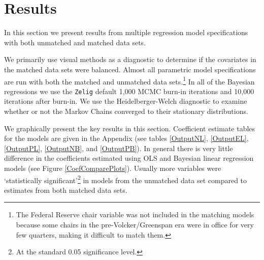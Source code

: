 \documentclass[a4paper]{article}\usepackage{graphicx, color}
\begin{document}
\section{Results}

In this section we present results from multiple regression model specifications with both unmatched and matched data sets. 

We primarily use visual methods as a diagnostic to determine if the covariates in the matched data sets were balanced.  Almost all parametric model specifications are run with both the matched and unmatched data sets.\footnote{The Federal Reserve chair variable was not included in the matching models because some chairs in the pre-Volcker/Greenspan era were in office for very few quarters, making it difficult to match them.} In all of the Bayesian regressions we use the {\tt{Zelig}} default 1,000 MCMC burn-in iterations and 10,000 iterations after burn-in. We use the Heidelberger-Welch diagnostic to examine whether or not the Markov Chains converged to their stationary distributions.

We graphically present the key results in this section. Coefficient estimate tables for the models are given in the Appendix (see tables \ref{OutputNL}, \ref{OutputEL}, \ref{OutputPL}, \ref{OutputNB}, and \ref{OutputPB}). In general there is very little difference in the coefficients estimated using OLS and Bayesian linear regression models (see Figure \ref{CoefComparePlots}). Usually more variables were `statistically significant'\footnote{At the standard 0.05 significance level.} in models from the unmatched data set compared to estimates from both matched data sets.
\end{document}
